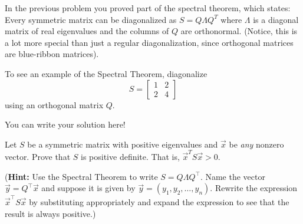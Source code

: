 \documentclass[]{exam}
\begin{document}
\begin{questions}

\question In the previous problem you proved part of the spectral theorem, which states: Every symmetric matrix can be diagonalized as $S = Q \Lambda Q^T$ where $\Lambda$ is a diagonal matrix of real eigenvalues and the columns of $Q$ are orthonormal. (Notice, this is a lot more special than just a regular diagonalization, since orthogonal matrices are blue-ribbon matrices). 

To see an example of the Spectral Theorem,
diagonalize
\[S = \begin{bmatrix}
1 & 2 \\ 2 & 4
\end{bmatrix}\]
using an orthogonal matrix $Q$.

\begin{solution}
	You can write your solution here!
\end{solution}

\question Let $S$ be a symmetric matrix with positive eigenvalues and $\vec{x}$ be \textit{any} nonzero vector. Prove that $S$ is positive definite. 
That is, $\vec{x}^T S \vec{x} >0$.

(\textbf{Hint:} Use the Spectral Theorem to write $S=Q\Lambda Q^\intercal$. 
Name the vector $\vec{y}=Q^\intercal\vec{x}$ and suppose it is given by $\vec{y}=(y_1,y_2,\dots,y_n)$. Rewrite the expression $\vec{x}^\intercal S \vec{x}$ by substituting appropriately and expand the expression to see that the result is always positive.)


\end{questions}
\end{document}
